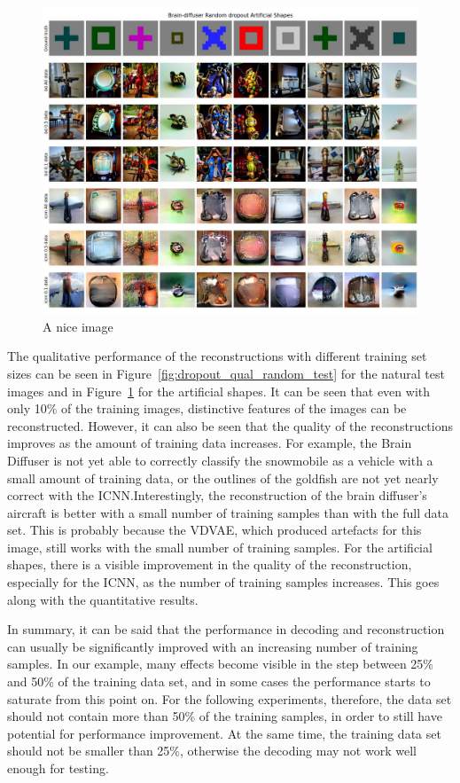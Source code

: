 \begin{figure}[ht]
    \centering
    \includegraphics[width=1\textwidth]{plots/dropout_qual_random_art.JPEG}
    \caption{A nice image}\label{fig:dropout_qual_random_art}
\end{figure}

The qualitative performance of the reconstructions with different training set sizes can be seen in Figure~\ref{fig:dropout_qual_random_test} for the natural test images and in Figure~\ref{fig:dropout_qual_random_art} for the artificial shapes. It can be seen that even with only 10\% of the training images, distinctive features of the images can be reconstructed. However, it can also be seen that the quality of the reconstructions improves as the amount of training data increases. For example, the Brain Diffuser is not yet able to correctly classify the snowmobile as a vehicle with a small amount of training data, or the outlines of the goldfish are not yet nearly correct with the ICNN.\@ Interestingly, the reconstruction of the brain diffuser's aircraft is better with a small number of training samples than with the full data set. This is probably because the VDVAE, which produced artefacts for this image, still works with the small number of training samples. For the artificial shapes, there is a visible improvement in the quality of the reconstruction, especially for the ICNN, as the number of training samples increases. This goes along with the quantitative results.

In summary, it can be said that the performance in decoding and reconstruction can usually be significantly improved with an increasing number of training samples. In our example, many effects become visible in the step between 25\% and 50\% of the training data set, and in some cases the performance starts to saturate from this point on. For the following experiments, therefore, the data set should not contain more than 50\% of the training samples, in order to still have potential for performance improvement. At the same time, the training data set should not be smaller than 25\%, otherwise the decoding may not work well enough for testing.

